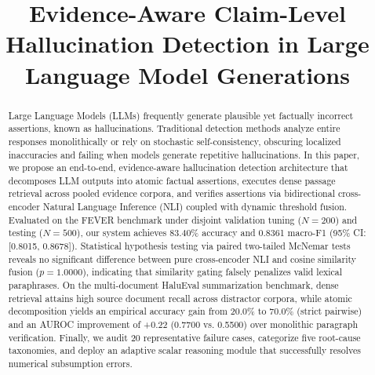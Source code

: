 \documentclass[conference]{IEEEtran}
\begin{document}
\title{Evidence-Aware Claim-Level Hallucination Detection in Large Language Model Generations}

\author{
}

\maketitle

\begin{abstract}
Large Language Models (LLMs) frequently generate plausible yet factually incorrect assertions, known as hallucinations. Traditional detection methods analyze entire responses monolithically or rely on stochastic self-consistency, obscuring localized inaccuracies and failing when models generate repetitive hallucinations. In this paper, we propose an end-to-end, evidence-aware hallucination detection architecture that decomposes LLM outputs into atomic factual assertions, executes dense passage retrieval across pooled evidence corpora, and verifies assertions via bidirectional cross-encoder Natural Language Inference (NLI) coupled with dynamic threshold fusion. Evaluated on the FEVER benchmark under disjoint validation tuning ($N=200$) and testing ($N=500$), our system achieves 83.40\% accuracy and 0.8361 macro-F1 (95\% CI: [0.8015, 0.8678]). Statistical hypothesis testing via paired two-tailed McNemar tests reveals no significant difference between pure cross-encoder NLI and cosine similarity fusion ($p=1.0000$), indicating that similarity gating falsely penalizes valid lexical paraphrases. On the multi-document HaluEval summarization benchmark, dense retrieval attains high source document recall across distractor corpora, while atomic decomposition yields an empirical accuracy gain from 20.0\% to 70.0\% (strict pairwise) and an AUROC improvement of +0.22 (0.7700 vs. 0.5500) over monolithic paragraph verification. Finally, we audit 20 representative failure cases, categorize five root-cause taxonomies, and deploy an adaptive scalar reasoning module that successfully resolves numerical subsumption errors.
\end{abstract}
\end{document}
